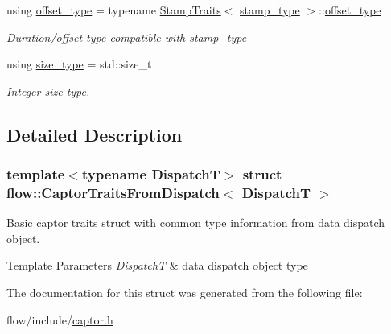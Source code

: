 \begin{DoxyCompactItemize}
using \hyperlink{structflow_1_1_captor_traits_from_dispatch_a230ae2724dc491631b2e6806113b72b0}{offset\+\_\+type} = typename \hyperlink{structflow_1_1_stamp_traits}{Stamp\+Traits}$<$ \hyperlink{structflow_1_1_captor_traits_from_dispatch_a33d283d578e545b1ce4c6c51b0b270f1}{stamp\+\_\+type} $>$\+::\hyperlink{structflow_1_1_captor_traits_from_dispatch_a230ae2724dc491631b2e6806113b72b0}{offset\+\_\+type}
\begin{DoxyCompactList}\small\item\em Duration/offset type compatible with {\ttfamily stamp\+\_\+type} \end{DoxyCompactList}\item 
\mbox{\label{structflow_1_1_captor_traits_from_dispatch_a27a621f56a740abb5fae3cfe8c4c1e88}} 
using \hyperlink{structflow_1_1_captor_traits_from_dispatch_a27a621f56a740abb5fae3cfe8c4c1e88}{size\+\_\+type} = std\+::size\+\_\+t
\begin{DoxyCompactList}\small\item\em Integer size type. \end{DoxyCompactList}\end{DoxyCompactItemize}


\subsection{Detailed Description}
\subsubsection*{template$<$typename DispatchT$>$\newline
struct flow\+::\+Captor\+Traits\+From\+Dispatch$<$ Dispatch\+T $>$}

Basic captor traits struct with common type information from data dispatch object. 


\begin{DoxyTemplParams}{Template Parameters}
{\em DispatchT} & data dispatch object type \\
\hline
\end{DoxyTemplParams}


The documentation for this struct was generated from the following file\+:\begin{DoxyCompactItemize}
\item 
flow/include/\hyperlink{captor_8h}{captor.\+h}\end{DoxyCompactItemize}
